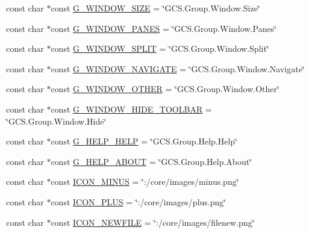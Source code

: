 \begin{DoxyCompactItemize}
\item 
const char $\ast$const \hyperlink{group___core_plugin_gaf7898919dfa3c4899d7c7fae6771ec53}{\-G\-\_\-\-W\-I\-N\-D\-O\-W\-\_\-\-S\-I\-Z\-E} = \char`\"{}\-G\-C\-S.\-Group.\-Window.\-Size\char`\"{}
\item 
const char $\ast$const \hyperlink{group___core_plugin_gac4d0d1e3f9431aeac156aadf24d299d5}{\-G\-\_\-\-W\-I\-N\-D\-O\-W\-\_\-\-P\-A\-N\-E\-S} = \char`\"{}\-G\-C\-S.\-Group.\-Window.\-Panes\char`\"{}
\item 
const char $\ast$const \hyperlink{group___core_plugin_ga3472fada8655f283eeb17e84f03a3dfb}{\-G\-\_\-\-W\-I\-N\-D\-O\-W\-\_\-\-S\-P\-L\-I\-T} = \char`\"{}\-G\-C\-S.\-Group.\-Window.\-Split\char`\"{}
\item 
const char $\ast$const \hyperlink{group___core_plugin_ga1f2d2e1bb10010e0ffec5da4d9683007}{\-G\-\_\-\-W\-I\-N\-D\-O\-W\-\_\-\-N\-A\-V\-I\-G\-A\-T\-E} = \char`\"{}\-G\-C\-S.\-Group.\-Window.\-Navigate\char`\"{}
\item 
const char $\ast$const \hyperlink{group___core_plugin_ga17fbb7b6ee9af5abd96e1b7110343f44}{\-G\-\_\-\-W\-I\-N\-D\-O\-W\-\_\-\-O\-T\-H\-E\-R} = \char`\"{}\-G\-C\-S.\-Group.\-Window.\-Other\char`\"{}
\item 
const char $\ast$const \hyperlink{group___core_plugin_ga4190c46f07971ca1d0556fdf9c45e8b4}{\-G\-\_\-\-W\-I\-N\-D\-O\-W\-\_\-\-H\-I\-D\-E\-\_\-\-T\-O\-O\-L\-B\-A\-R} = \char`\"{}\-G\-C\-S.\-Group.\-Window.\-Hide\char`\"{}
\item 
const char $\ast$const \hyperlink{group___core_plugin_ga8e2fb85a38cf8aedef4ada147ef05f83}{\-G\-\_\-\-H\-E\-L\-P\-\_\-\-H\-E\-L\-P} = \char`\"{}\-G\-C\-S.\-Group.\-Help.\-Help\char`\"{}
\item 
const char $\ast$const \hyperlink{group___core_plugin_ga7296b3913219eb7bd0b5d11808f0dadc}{\-G\-\_\-\-H\-E\-L\-P\-\_\-\-A\-B\-O\-U\-T} = \char`\"{}\-G\-C\-S.\-Group.\-Help.\-About\char`\"{}
\item 
const char $\ast$const \hyperlink{group___core_plugin_ga730ed9f9def50bbb8a79684683085e91}{\-I\-C\-O\-N\-\_\-\-M\-I\-N\-U\-S} = \char`\"{}\-:/core/images/minus.\-png\char`\"{}
\item 
const char $\ast$const \hyperlink{group___core_plugin_ga1f1123aa3afe63da0ff3a3c4ad983a9b}{\-I\-C\-O\-N\-\_\-\-P\-L\-U\-S} = \char`\"{}\-:/core/images/plus.\-png\char`\"{}
\item 
const char $\ast$const \hyperlink{group___core_plugin_ga830208226f7ff1db69131f38a10caa1a}{\-I\-C\-O\-N\-\_\-\-N\-E\-W\-F\-I\-L\-E} = \char`\"{}\-:/core/images/filenew.\-png\char`\"{}

\end{DoxyCompactItemize}
